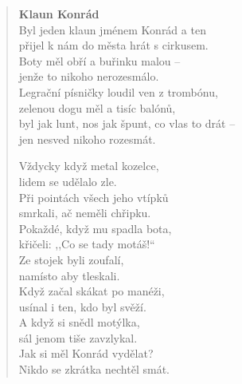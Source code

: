 \begin{verse}
\textbf{Klaun Konrád}\\
\smallskip
Byl jeden klaun jménem Konrád a ten \\
přijel k nám do města hrát s cirkusem.\\
Boty měl obří a buřinku malou –\\
jenže to nikoho nerozesmálo.\\
Legrační písničky loudil ven z trombónu,\\
zelenou dogu měl a tisíc balónů,\\
byl jak lunt, nos jak špunt, co vlas to drát –  \\
jen nesved nikoho rozesmát.

\medskip

Vždycky když metal kozelce,\\
lidem se udělalo zle.\\
Při pointách všech jeho vtípků\\
smrkali, ač neměli chřipku.\\
Pokaždé, když mu spadla bota,\\
křičeli: ,,Co se tady motáš!``\\
Ze stojek byli zoufalí,\\
namísto aby tleskali.\\
Když začal skákat po manéži,  \\
usínal i ten, kdo byl svěží.\\
A když si snědl motýlka,\\
sál jenom tiše zavzlykal.\\
Jak si měl Konrád vydělat?\\
Nikdo se zkrátka nechtěl smát.

\medskip


\end{verse}

